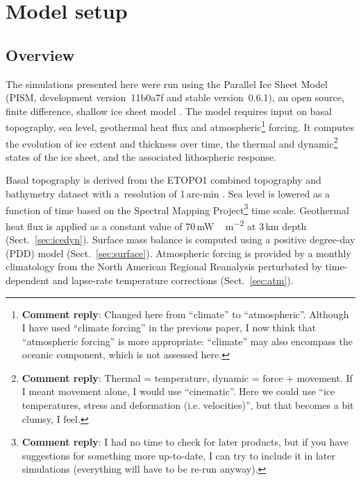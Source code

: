 \documentclass[tc, manuscript]{copernicus}
\newcommand{\renote}[1]{\footnote{\textbf{Comment reply}: #1}}
\begin{document}
\section{Model setup}
\label{sec:model}

\subsection{Overview}
\label{sec:overview}

The simulations presented here were run using the Parallel Ice Sheet Model
(PISM, development version~11b0a7f and stable version~0.6.1), an open source,
finite difference, shallow ice sheet model \citep{PISM-authors.2014}. The model
requires input on basal topography, sea level, geothermal heat flux and
atmospheric\renote{
    Changed here from ``climate'' to ``atmospheric''. Although I have used
    ``climate forcing'' in the previous paper, I now think that ``atmospheric
    forcing'' is more appropriate: ``climate'' may also encompass the oceanic
    component, which is not assessed here.}
forcing. It computes the evolution of ice extent
and thickness over time, the thermal and dynamic\renote{
    Thermal = temperature, dynamic = force + movement. If I meant movement
    alone, I would use ``cinematic''. Here we could use ``ice temperatures,
    stress and deformation (i.e. velocities)'', but that becomes a bit clumsy,
    I feel.}
states of the ice sheet, and the associated lithospheric response.

Basal topography is derived from the ETOPO1 combined topography and bathymetry
dataset with a~resolution of 1\,arc-min \citep{Amante.Eakins.2009}. Sea level
is lowered as a function of time based on the Spectral Mapping Project\renote{
    I had no time to check for later products, but if you have suggestions for
    something more up-to-date, I can try to include it in later simulations
    (everything will have to be re-run anyway).}
\citep[SPECMAP;][]{Imbrie.etal.1989} time scale. Geothermal heat flux
is applied as a constant value of 70\,\unit{mW\,m^{-2}} at 3\,km depth
(Sect.~\ref{sec:icedyn}). Surface mass balance is computed using a positive
degree-day (PDD) model (Sect.~\ref{sec:surface}). Atmospheric forcing is
provided by a monthly climatology from the North American Regional Reanalysis
\citep[NARR;][]{Mesinger.etal.2006} perturbated by time-dependent and
lapse-rate temperature corrections (Sect.~\ref{sec:atm}).
\end{document}
